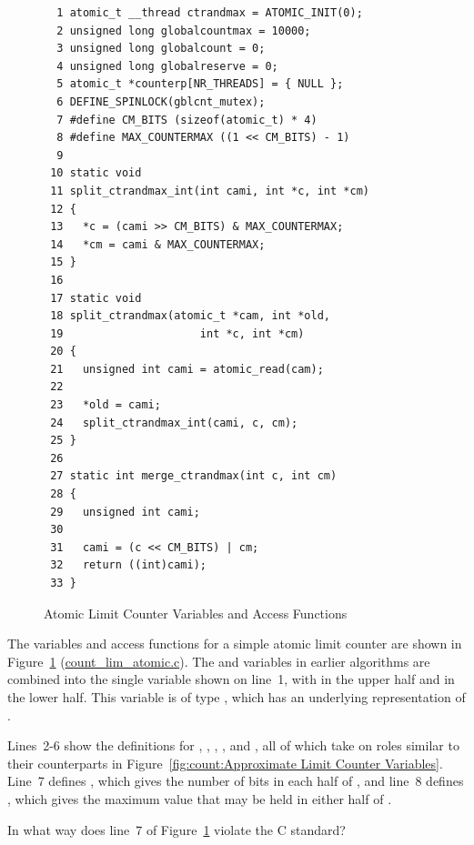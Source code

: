 \begin{figure}[tbp]
{ \scriptsize
\begin{verbatim}
  1 atomic_t __thread ctrandmax = ATOMIC_INIT(0);
  2 unsigned long globalcountmax = 10000;
  3 unsigned long globalcount = 0;
  4 unsigned long globalreserve = 0;
  5 atomic_t *counterp[NR_THREADS] = { NULL };
  6 DEFINE_SPINLOCK(gblcnt_mutex);
  7 #define CM_BITS (sizeof(atomic_t) * 4)
  8 #define MAX_COUNTERMAX ((1 << CM_BITS) - 1)
  9 
 10 static void
 11 split_ctrandmax_int(int cami, int *c, int *cm)
 12 {
 13   *c = (cami >> CM_BITS) & MAX_COUNTERMAX;
 14   *cm = cami & MAX_COUNTERMAX;
 15 }
 16 
 17 static void
 18 split_ctrandmax(atomic_t *cam, int *old,
 19                     int *c, int *cm)
 20 {
 21   unsigned int cami = atomic_read(cam);
 22 
 23   *old = cami;
 24   split_ctrandmax_int(cami, c, cm);
 25 }
 26 
 27 static int merge_ctrandmax(int c, int cm)
 28 {
 29   unsigned int cami;
 30 
 31   cami = (c << CM_BITS) | cm;
 32   return ((int)cami);
 33 }
\end{verbatim}
}
\caption{Atomic Limit Counter Variables and Access Functions}
\label{fig:count:Atomic Limit Counter Variables and Access Functions}
\end{figure}

The variables and access functions for a simple atomic limit counter
are shown in
Figure~\ref{fig:count:Atomic Limit Counter Variables and Access Functions}
(\url{count_lim_atomic.c}).
The  and  variables in earlier algorithms
are combined into the single variable  shown on
line~1, with  in the upper half and  in
the lower half.
This variable is of type , which has an underlying
representation of .

Lines~2-6 show the definitions for , ,
, , and , all of which
take on roles similar to their counterparts in
Figure~\ref{fig:count:Approximate Limit Counter Variables}.
Line~7 defines , which gives the number of bits in each half
of , and line~8 defines , which
gives the maximum value that may be held in either half of
.

\QuickQuiz{}
	In what way does line~7 of
	Figure~\ref{fig:count:Atomic Limit Counter Variables and Access Functions}
	violate the C standard?
 \QuickQuizEnd

